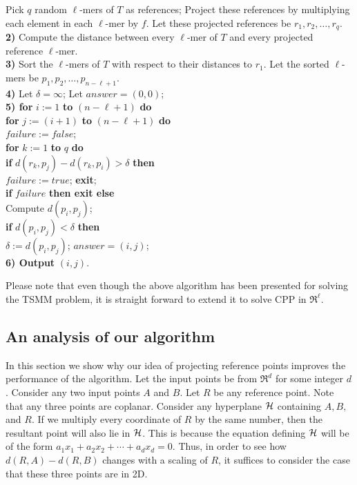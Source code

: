 \documentclass{article}
\theoremstyle{definition}
\theoremstyle{remark}
\begin{document}
\vspace{-0.15in}
  Pick $q$ random $\ell$-mers of $T$ as references; Project these
references by multiplying each element in each $\ell$-mer
 by $f$. Let these projected references be $r_1,r_2,\ldots,r_q$.\\
 {\bf 2)} Compute the distance between every $\ell$-mer of $T$ and
 every projected reference $\ell$-mer.\\
{\bf 3)} Sort the $\ell$-mers of $T$ with respect to their distances
 to $r_1$. Let the sorted $\ell$-mers be
$p_1,p_2,\ldots,p_{n-\ell+1}$.\\
{\bf 4)} Let $\delta=\infty$; Let $answer=(0,0)$;\\
{\bf 5) for} $i:=1$ {\bf to} $(n-\ell+1)$ {\bf do}\\
\hspace*{0.4in} {\bf for} $j:=(i+1)$ {\bf to} $(n-\ell+1)$ {\bf do}\\
\hspace*{0.7in} $failure:=false$;\\
\hspace*{0.7in} {\bf for} $k:=1$ {\bf to} $q$ {\bf do}\\
\hspace*{0.9in} {\bf if} $d(r_k,p_j)-d(r_k,p_i)>\delta$ {\bf then}\\
\hspace*{1.1in} $failure:=true$; {\bf exit};\\
\hspace*{0.7in} {\bf if} $failure$ {\bf then exit else}\\
\hspace*{0.9in} Compute $d(p_i,p_j)$; \\
\hspace*{0.9in} {\bf if} $d(p_i,p_j)<\delta$ {\bf then}\\
\hspace*{1.1in} $\delta:=d(p_i,p_j)$; $answer=(i,j)$;\\
{\bf 6) Output} $(i,j)$.

 Please note that even though the above algorithm has been presented for solving the TSMM problem, it is straight forward to extend it to solve CPP in $\Re^\ell$.

\subsection{An analysis of our algorithm}
In this section we show why our idea of projecting reference points improves the performance of the algorithm. Let the input points be from $\Re^d$ for some integer $d$. Consider any two input points $A$ and $B$. Let $R$ be any reference point. Note that any three points are coplanar. Consider any hyperplane $\cal H$ containing $A,B,$ and $R$. If we multiply every coordinate of $R$ by the same number, then the resultant point will also lie in $\cal H$. This is because the equation defining $\cal H$ will be of the form $a_1x_1+a_2x_2+\cdots+a_dx_d=0$. Thus, in order to see how $d(R,A)-d(R,B)$ changes with a scaling of $R$, it suffices to consider the case that these three points are in 2D.
\end{document}
